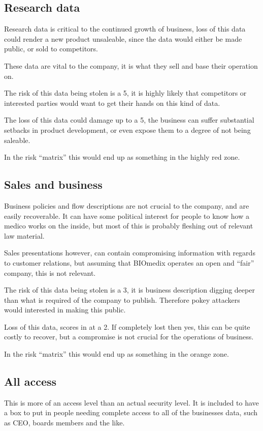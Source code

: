 \documentclass[paper=a4, fontsize=11pt]{scrartcl} %
\numberwithin{equation}{section} %
\numberwithin{figure}{section} %
\numberwithin{table}{section} %
\begin{document}
\subsection{Research data}
Research data is critical to the continued growth of business, loss of this data
could render a new product unsaleable, since the data would either be made
public, or sold to competitors.

These data are vital to the company, it is what they sell and base their
operation on.

The risk of this data being stolen is a 5, it is highly likely that competitors
or interested parties would want to get their hands on this kind of data.

The loss of this data could damage up to a 5, the business can suffer
substantial setbacks in product development, or even expose them to a degree of
not being saleable.

In the risk ``matrix'' this would end up as something in the highly red zone.

\subsection{Sales and business}
Business policies and flow descriptions are not crucial to the company, and
are easily recoverable. It can have some political interest for people to
know how a medico works on the inside, but most of this is probably fleshing
out of relevant law material.

Sales presentations however, can contain compromising information with regards
to customer relations, but assuming that BIOmedix operates an open and ``fair''
company, this is not relevant.

The risk of this data being stolen is a 3, it is business description digging
deeper than what is required of the company to publish. Therefore pokey
attackers would interested in making this public.

Loss of this data, scores in at a 2. If completely lost then yes, this can be
quite costly to recover, but a compromise is not crucial for the operations of
business.

In the risk ``matrix'' this would end up as something in the orange zone.

\subsection{All access}
This is more of an access level than an actual security level. It is included
to have a box to put in people needing complete access to all of the businesses
data, such as CEO, boards members and the like.
\end{document}

